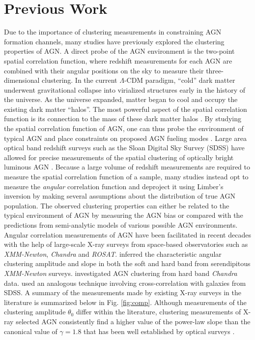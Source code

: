 \documentclass[preprint]{aastex63}
\begin{document}
\section{Previous Work} 
Due to the importance of clustering measurements in constraining AGN formation channels, many studies have previously explored the clustering properties of AGN. 
A direct probe of the AGN environment is the two-point spatial correlation function, where redshift measurements for each AGN are
combined with their angular positions on the sky to measure their three-dimensional clustering. In the current $\Lambda$-CDM paradigm, ``cold'' dark matter underwent gravitational collapse 
into virialized structures early in the history of the universe. As the universe expanded, matter began to cool and occupy the existing dark matter ``halos''. The most powerful aspect of the spatial correlation function is 
its connection to the mass of these dark matter halos \citep{mo:1996}. By studying the spatial correlation function of AGN, one can thus probe the environment of typical AGN and place constraints on proposed AGN fueling modes \citep{krolewski:2015}. 
 Large area optical band redshift surveys such as the Sloan Digital Sky Survey (SDSS) 
have allowed for precise measurements of the spatial clustering of optically bright luminous AGN  \citep{ross:2009}.
Because a large volume of redshift measurements are required to measure the spatial correlation function of a sample, many studies instead opt 
to measure the \textit{angular} correlation function and deproject it using Limber's inversion \citep{limber} by making several assumptions about 
the distribution of true AGN population. 
The observed clustering properties can either be related to the typical environment of AGN by measuring the AGN bias \citep[see below]{tinker:2005} or compared with the predictions from semi-analytic models of various possible AGN environments.  
Angular correlation measurements of AGN have been facilitated in recent decades with the help of large-scale X-ray surveys from space-based observatories 
such as \textit{XMM-Newton}, \textit{Chandra} and \textit{ROSAT}. \citet{elyiv,ebrero,gandhi} inferred the characteristic angular clustering amplitude and slope 
in both the soft and hard band from serendipitous \textit{XMM-Newton} surveys. \citet{koutoulidis} investigated AGN clustering from hard band \textit{Chandra} data. \citet{miyaji} used an analogous 
technique involving cross-correlation with galaxies from SDSS. A summary of the measurements made by existing X-ray surveys in the literature 
is summarized below in Fig. \ref{fig:comp}. Although measurements of the clustering amplitude $\theta_0$ differ within the literature, 
clustering measurements of X-ray selected AGN consistently find a higher value of the power-law slope than the 
canonical value of $\gamma = 1.8$ that has been well established by optical surveys \citep{peebles:1980}.
\end{document}
